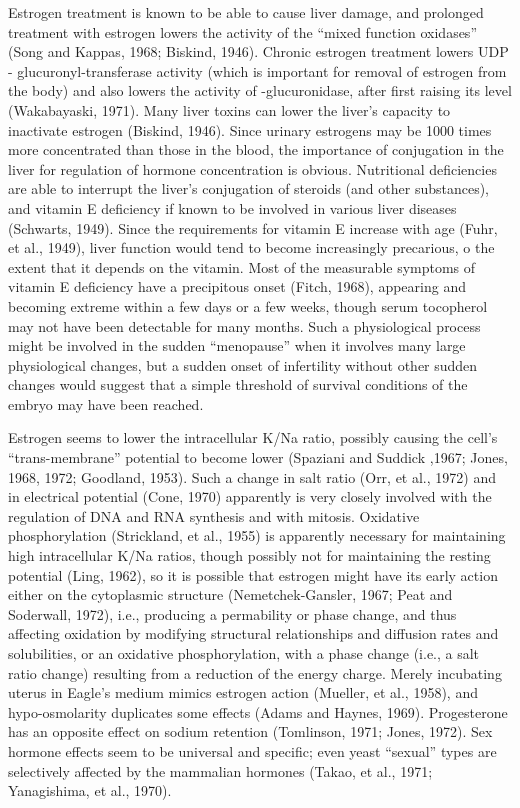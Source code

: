 Estrogen treatment is known to be able to cause liver damage, and prolonged treatment with estrogen lowers the activity of the ``mixed function oxidases'' (Song and Kappas, 1968; Biskind, 1946). Chronic estrogen treatment lowers UDP - glucuronyl-transferase activity (which is important for removal of estrogen
from the body) and also lowers the activity of -glucuronidase, after first raising its level (Wakabayaski, 1971). Many liver toxins can lower the liver's capacity to inactivate estrogen (Biskind, 1946). Since urinary estrogens may be 1000 times more concentrated than those in the blood, the importance of conjugation
in the liver for regulation of hormone concentration is obvious. Nutritional deficiencies are able to interrupt the liver's conjugation of steroids (and other substances), and vitamin E deficiency if known to be involved in various liver diseases (Schwarts, 1949). Since the requirements for vitamin E increase with age (Fuhr, et al., 1949), liver
function would tend to become increasingly precarious, o the extent that it depends on the vitamin. Most of the measurable symptoms of vitamin E deficiency have a precipitous onset (Fitch, 1968), appearing and becoming extreme within a few days or a few weeks, though serum tocopherol may not have been detectable for many months. Such
a physiological process might be involved in the sudden ``menopause'' when it involves many large physiological changes, but a sudden onset of infertility without other sudden changes would suggest that a simple threshold of survival conditions of the embryo may have been reached.

Estrogen seems to lower the intracellular K/Na ratio, possibly causing the cell's ``trans-membrane'' potential to become lower (Spaziani and Suddick ,1967; Jones, 1968, 1972; Goodland, 1953). Such a change in salt ratio (Orr, et al., 1972) and in electrical potential (Cone, 1970) apparently is very closely involved with the
regulation of DNA and RNA synthesis and with mitosis. Oxidative phosphorylation (Strickland, et al., 1955) is apparently necessary for maintaining high intracellular K/Na ratios, though possibly not for maintaining the resting potential (Ling, 1962), so it is possible that estrogen might have its early action either on the cytoplasmic
structure (Nemetchek-Gansler, 1967; Peat and Soderwall, 1972), i.e., producing a permability or phase change, and thus affecting oxidation by modifying structural relationships and diffusion rates and solubilities, or an oxidative phosphorylation, with a phase change (i.e., a salt ratio change) resulting from a reduction of the energy
charge. Merely incubating uterus in Eagle's medium mimics estrogen action (Mueller, et al., 1958), and hypo-osmolarity duplicates some effects (Adams and Haynes, 1969). Progesterone has an opposite effect on sodium retention (Tomlinson, 1971; Jones, 1972). Sex hormone effects seem to be universal and specific; even yeast ``sexual'' types are
selectively affected by the mammalian hormones (Takao, et al., 1971; Yanagishima, et al., 1970).

